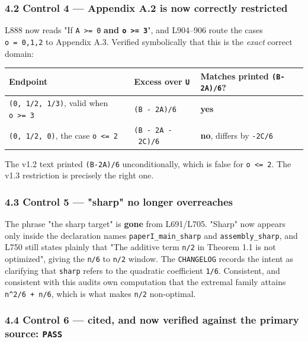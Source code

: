 \documentclass[
  9pt,
  a4paper,
]{article}
\newcounter{none} %
\begin{document}
\subsubsection{4.2 Control 4 --- Appendix A.2 is now correctly
restricted}\label{42-control-4--appendix-a2-is-now-correctly-restricted}

L888 now reads "If \texttt{A\ \textgreater{}=\ 0} \textbf{and
\texttt{o\ \textgreater{}=\ 3}}", and L904--906 route the cases
\texttt{o\ =\ 0,1,2} to Appendix A.3. Verified symbolically that this is
the \emph{exact} correct domain:

{\def\LTcaptype{none} %
\begin{longtable}[]{@{}lll@{}}
\toprule\noalign{}
Endpoint & Excess over \texttt{U} & Matches printed
\texttt{(B-2A)/6}? \\
\midrule\noalign{}
\endhead
\bottomrule\noalign{}
\endlastfoot
\texttt{(0,\ 1/2,\ 1/3)}, valid when \texttt{o\ \textgreater{}=\ 3} &
\texttt{(B\ -\ 2A)/6} & \textbf{yes} \\
\texttt{(0,\ 1/2,\ 0)}, the case \texttt{o\ \textless{}=\ 2} &
\texttt{(B\ -\ 2A\ -\ 2C)/6} & \textbf{no}, differs by \texttt{-2C/6} \\
\end{longtable}
}

The v1.2 text printed \texttt{(B-2A)/6} unconditionally, which is false
for \texttt{o\ \textless{}=\ 2}. The v1.3 restriction is precisely the
right one.

\subsubsection{4.3 Control 5 --- "sharp" no longer
overreaches}\label{43-control-5--sharp-no-longer-overreaches}

The phrase "the sharp target" is \textbf{gone} from L691/L705. "Sharp"
now appears only inside the declaration names
\texttt{paperI\_main\_sharp} and \texttt{assembly\_sharp}, and L750
still states plainly that "The additive term \texttt{n/2} in Theorem 1.1
is not optimized", giving the \texttt{n/6} to \texttt{n/2} window. The
\texttt{CHANGELOG} records the intent as clarifying that \texttt{sharp}
refers to the quadratic coefficient \texttt{1/6}. Consistent, and
consistent with this audit\textquotesingle s own computation that the
extremal family attains \texttt{n\^{}2/6\ +\ n/6}, which is what makes
\texttt{n/2} non-optimal.

\subsubsection{\texorpdfstring{4.4 Control 6 --- cited, and now verified
against the primary source:
\texttt{PASS}}{4.4 Control 6 --- cited, and now verified against the primary source: PASS}}\label{44-control-6--cited-and-now-verified-against-the-primary-source-pass}
\end{document}
